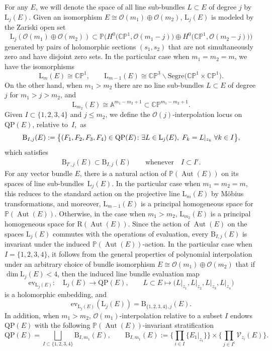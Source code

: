 \documentclass[pdftex]{sigma}
\newcommand{\field}[1]{\ensuremath{\mathbb{#1}}}
\newcommand{\CC}{\field{C}}
\newcommand{\PP}{\field{P}}
\newcommand{\calO}{\mathcal{O}}
\newcommand{\curly}[1]{\mathscr{#1}}
\newcommand{\cV}{\curly{V}}
\DeclareMathOperator{\Aut}{Aut}
\numberwithin{equation}{section}
\begin{document}
For any $E$, we will denote the space of all line sub-bundles $L\subset E$ of degree $j$ by $\mathrm{L}_{j}(E)$. Given an isomorphism $E\cong \calO(m_{1})\oplus\calO(m_{2})$, $\mathrm{L}_{j}(E)$ is modeled by the Zariski open set
\[
\mathrm{L}_{j}(\calO(m_{1})\oplus\calO(m_{2})) \subset \PP\bigl(H^{0}\big(\CC\PP^{1},\calO(m_{1}-j)\big)\oplus H^{0}\big(\CC\PP^{1},\calO(m_{2}-j)\big)\bigr)
\]
generated by pairs of holomorphic sections $(s_{1},s_{2})$ that are not simultaneously zero and have disjoint zero sets. In the particular case when $m_{1}=m_{2}=m$, we have the isomorphisms
\[
\mathrm{L}_{m}(E)\cong\CC\PP^{1},\qquad \mathrm{L}_{m-1}(E)\cong\CC\PP^{3}\backslash \mathrm{Segre}\big(\CC\PP^{1}\times\CC\PP^{1}\big).
\]
On the other hand, when $m_{1} > m_{2}$ there are no line sub-bundles $L\subset E$ of degree $j$ for $m_{1} > j > m_{2}$, and
\[
\mathrm{L}_{m_{2}}(E)\cong \mathbb{A}^{m_{1}-m_{2}+1}\subset \CC\PP^{m_{1}-m_{2}+1}.
\]
Given $I\subset\{1,2,3,4\}$ and $j\leq m_{2}$, we define the $\calO(j)$-interpolation locus on $\mathrm{QP}(E)$, relative to~$I$,~as
\begin{gather}\label{eq:B_{I,j}(E)}
\mathrm{B}_{I,j}(E) := \bigl\{(F_{1},F_{2},F_{3},F_{4})\in\mathrm{QP}(E)\colon \exists L\in\mathrm{L}_{j}(E),\; F_{k} = L\vert_{z_{k}}\; \forall k\in I \bigr\},
\end{gather}
which satisfies
\begin{gather}\label{eq:I<I'}
\mathrm{B}_{I',j}(E)\subset \mathrm{B}_{I,j}(E)\qquad \text{whenever}\quad I\subset I'.
\end{gather}
For any vector bundle $E$, there is a natural action of $\PP(\Aut(E))$ on its spaces of line sub-bund\-les~$\mathrm{L}_{j}(E)$. In the particular case when $m_{1}=m_{2}=m$, this reduces to the standard action on the projective line $\mathrm{L}_{m}(E)$ by M\"obius transformations, and moreover, $\mathrm{L}_{m-1}(E)$ is a principal homogeneous space for $\PP(\Aut(E))$. Otherwise, in the case when $m_{1}>m_{2}$, $\mathrm{L}_{m_{2}}(E)$ is a principal homogeneous space for $\mathrm{R}(\Aut(E))$.
Since the action of $\Aut (E)$ on the spaces $\mathrm{L}_{j}(E)$ commutes with the operations of evaluation, every $\mathrm{B}_{I,j}(E)$ is invariant under the induced $\PP(\Aut(E))$-action. In the particular case when $I=\{1,2,3,4\}$, it follows from the general properties of polynomial interpolation under an arbitrary choice of bundle isomorphism $E\cong \calO(m_{1})\oplus\calO(m_{2})$ that if $\dim \mathrm{L}_{j}(E)<4$, then the induced line bundle evaluation map
\[
\mathrm{ev}_{\mathrm{L}_{j}(E)}\colon\quad \mathrm{L}_{j}(E)\rightarrow \mathrm{QP}(E),\qquad L\subset E\mapsto \bigl(L\vert_{z_{1}},L\vert_{z_{2}},L\vert_{z_{3}},L\vert_{z_{4}}\bigr)
\]
is a holomorphic embedding, and
\[
\mathrm{ev}_{\mathrm{L}_{j}(E)}(\mathrm{L}_{j}(E)) = \mathrm{B}_{\{1,2,3,4\},j}(E).
\]
In addition, when $m_{1} > m_{2}$, $\calO(m_{1})$-interpolation relative to a subset $I$ endows $\mathrm{QP}(E)$ with the following $\PP(\Aut(E))$-invariant stratification
\[
\mathrm{QP}(E) = \bigsqcup_{I\subset\{1,2,3,4\}}\mathrm{B}_{I,m_{1}}(E),\qquad
\mathrm{B}_{I,m_{1}}(E) := \bigg\{\prod_{i\in I}\{E_{1}\vert_{z_{i}}\} \bigg\} \times \bigg\{\prod_{j\in I^{\mathsf{c}}}\cV_{z_{i}}(E) \bigg\}.
\]
\end{document}
